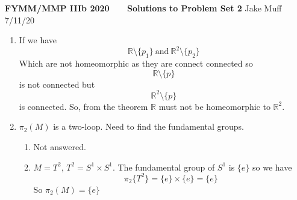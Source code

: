 \documentclass[12pt]{article}
\begin{document}
\normalsize

\baselineskip 14pt

\begin{center}
{\Large {\bf FYMM/MMP IIIb 2020 \ \ \ Solutions to  Problem Set 2}}
Jake Muff 
7/11/20
\end{center}


\begin{enumerate}

\item %
If we have 
$$ \mathbb{R} \setminus \{p_1\} \  \textrm{and} \ \mathbb{R}^2 \setminus \{ p_2 \} $$
Which are not homeomorphic as they are connect connected so 
$$ \mathbb{R} \setminus \{ p \} $$
is not connected but 
$$ \mathbb{R}^2 \setminus \{ p \} $$
is connected. So, from the theorem $\mathbb{R}$ must not be homeomorphic to $\mathbb{R}^2$.


\item $\pi_2 (M)$ is a two-loop. Need to find the fundamental groups. 
\begin{enumerate}
    \item Not answered. 
    
    \item $M=T^2$, $T^2 = S^1 \times S^1$. The fundamental group of $S^1$ is $\{ e\}$ so we have 
    $$ \pi_2 \{ T^2 \} = \{e \} \times \{ e\} = \{ e\} $$
    So $\pi_2 (M) = \{ e \} $
\end{enumerate}


\end{enumerate}
\end{document}
